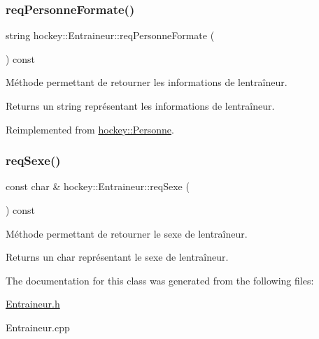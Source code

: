 \subsubsection{\texorpdfstring{req\+Personne\+Formate()}{reqPersonneFormate()}}
{\footnotesize\ttfamily string hockey\+::\+Entraineur\+::req\+Personne\+Formate (\begin{DoxyParamCaption}{ }\end{DoxyParamCaption}) const\hspace{0.3cm}{\ttfamily [virtual]}}



Méthode permettant de retourner les informations de l\textquotesingle{}entraîneur. 

\begin{DoxyReturn}{Returns}
un string représentant les informations de l\textquotesingle{}entraîneur. 
\end{DoxyReturn}


Reimplemented from \hyperlink{classhockey_1_1Personne_ae67b3d253c1fa8a090dd8040ca1e8ccc}{hockey\+::\+Personne}.

\mbox{\label{classhockey_1_1Entraineur_a8bd3cd9717f896085b74782e5b1170fc}} 
\subsubsection{\texorpdfstring{req\+Sexe()}{reqSexe()}}
{\footnotesize\ttfamily const char \& hockey\+::\+Entraineur\+::req\+Sexe (\begin{DoxyParamCaption}{ }\end{DoxyParamCaption}) const}



Méthode permettant de retourner le sexe de l\textquotesingle{}entraîneur. 

\begin{DoxyReturn}{Returns}
un char représentant le sexe de l\textquotesingle{}entraîneur. 
\end{DoxyReturn}


The documentation for this class was generated from the following files\+:\begin{DoxyCompactItemize}
\item 
\hyperlink{Entraineur_8h}{Entraineur.\+h}\item 
Entraineur.\+cpp\end{DoxyCompactItemize}
